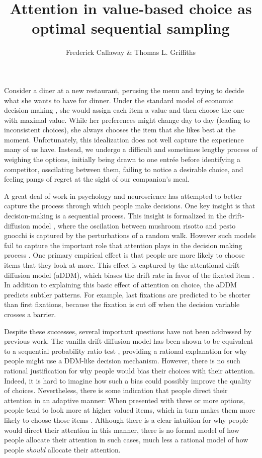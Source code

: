 \documentclass[12pt,a4paperpaper,]{article}
\title{\vspace{-2em}Attention in value-based choice as optimal sequential sampling}
\author{Frederick Callaway \& Thomas L. Griffiths}
\date{\vspace{-1em}}
\begin{document}
\maketitle




Consider a diner at a new restaurant, perusing the menu and trying to decide what she wants to have for dinner. Under the standard model of economic decision making \citep{Rangel2008,Kahneman1979}, she would assign each item a value and then choose the one with maximal value. While her preferences might change day to day (leading to inconsistent choices), she always chooses the item that she likes best at the moment. Unfortunately, this idealization does not well capture the experience many of us have. Instead, we undergo a difficult and sometimes lengthy process of weighing the options, initially being drawn to one entr\'ee before identifying a competitor, osscilating between them, failing to notice a desirable choice, and feeling pangs of regret at the sight of our companion's meal.

A great deal of work in psychology and neuroscience has attempted to better capture the process through which people make decisions. One key insight is that decision-making is a sequential process. This insight is formalized in the drift-diffusion model \citep{Ratcliff1978,Milosavljevic2010}, where the oscilation between mushroom risotto and pesto gnocchi is captured by the perturbations of a random walk. However such models fail to capture the important role that attention plays in the decision making process \citep{Orquin2013}. One primary empirical effect is that people are more likely to choose items that they look at more. This effect is captured by the attentional drift diffusion model (aDDM), which biases the drift rate in favor of the fixated item \citep{Krajbich2010}. In addition to explaining this basic effect of attention on choice, the aDDM predicts subtler patterns. For example, last fixations are predicted to be shorter than first fixations, because the fixation is cut off when the decision variable crosses a barrier.


Despite these successes, several important questions have not been addressed by previous work. The vanilla drift-diffusion model has been shown to be equivalent to a sequential probability ratio test \citep{Bogacz2006, Bitzer2014}, providing a rational explanation for why people might use a DDM-like decision mechanism. However, there is no such rational justification for why people would bias their choices with their attention. Indeed, it is hard to imagine how such a bias could possibly improve the quality of choices. Nevertheless, there is some indication that people direct their attention in an adaptive manner: When presented with three or more options, people tend to look more at higher valued items, which in turn makes them more likely to choose those items  \citep{Krajbich2011}. Although there is a clear intuition for why people would direct their attention in this manner, there is no formal model of how people allocate their attention in such cases, much less a rational model of how people \emph{should} allocate their attention.
\end{document}
